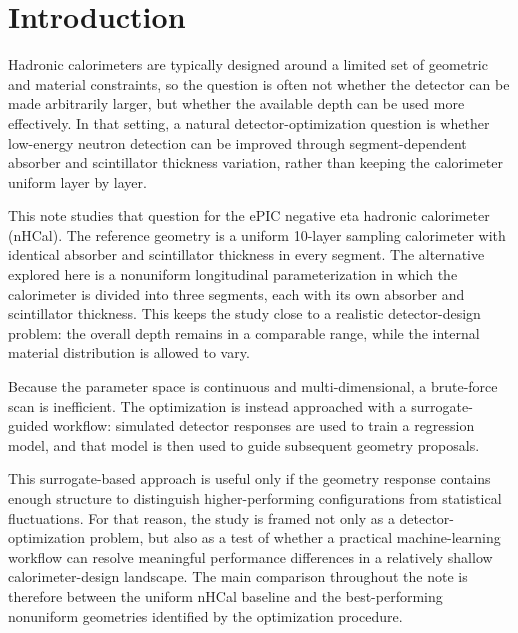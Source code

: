 \section{Introduction}\label{sec:introduction}

\noindent Hadronic calorimeters are typically designed around a limited set of geometric and material constraints, so the question is often not whether the detector
can be made arbitrarily larger, but whether the available depth can be used more effectively. In that setting, a natural detector-optimization question is whether
low-energy neutron detection can be improved through segment-dependent absorber and scintillator thickness variation, rather than keeping the calorimeter
uniform layer by layer.

\noindent This note studies that question for the ePIC negative eta hadronic calorimeter (nHCal). The reference geometry is a uniform 10-layer sampling calorimeter
with identical absorber and scintillator thickness in every segment. The alternative explored here is a nonuniform longitudinal parameterization in which the calorimeter
is divided into three segments, each with its own absorber and scintillator thickness. This keeps the study close to a realistic detector-design problem: the overall depth
remains in a comparable range, while the internal material distribution is allowed to vary.

\noindent Because the parameter space is continuous and multi-dimensional, a brute-force scan is inefficient. The optimization is instead approached with a
surrogate-guided workflow: simulated detector responses are used to train a regression model, and that model is then used to guide subsequent geometry proposals.

\noindent This surrogate-based approach is useful only if the geometry response contains enough structure to distinguish higher-performing configurations from statistical
fluctuations. For that reason, the study is framed not only as a detector-optimization problem, but also as a test of whether a practical machine-learning workflow can
resolve meaningful performance differences in a relatively shallow calorimeter-design landscape. The main comparison throughout the note is therefore between the uniform
nHCal baseline and the best-performing nonuniform geometries identified by the optimization procedure.
